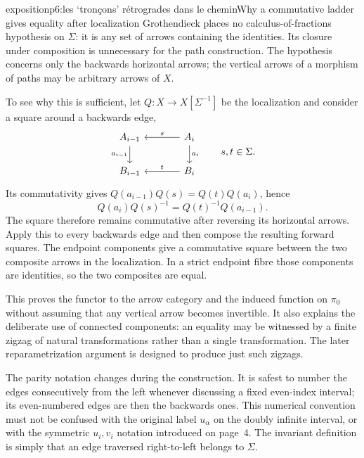 \begin{dcomment}{exposition}{p6:les `tronçons' rétrogrades dans le chemin}{Why a commutative ladder gives equality after localization}
Grothendieck places no calculus-of-fractions hypothesis on $\Sigma$: it is any set of arrows containing the identities. Its closure under composition is unnecessary for the path construction. The hypothesis concerns only the backwards horizontal arrows; the vertical arrows of a morphism of paths may be arbitrary arrows of $X$.

To see why this is sufficient, let $Q:X\to X[\Sigma^{-1}]$ be the localization and consider a square around a backwards edge,
\[
\begin{tikzcd}[column sep=large]
 A_{i-1}\arrow[d,"a_{i-1}"'] & A_i\arrow[l,"s"']\arrow[d,"a_i"]\\
 B_{i-1} & B_i\arrow[l,"t"']
\end{tikzcd}
\qquad s,t\in\Sigma.
\]
Its commutativity gives $Q(a_{i-1})Q(s)=Q(t)Q(a_i)$, hence
\[
 Q(a_i)Q(s)^{-1}=Q(t)^{-1}Q(a_{i-1}).
\]
The square therefore remains commutative after reversing its horizontal arrows. Apply this to every backwards edge and then compose the resulting forward squares. The endpoint components give a commutative square between the two composite arrows in the localization. In a strict endpoint fibre those components are identities, so the two composites are equal.

This proves the functor to the arrow category and the induced function on $\pi_0$ without assuming that any vertical arrow becomes invertible. It also explains the deliberate use of connected components: an equality may be witnessed by a finite zigzag of natural transformations rather than a single transformation. The later reparametrization argument is designed to produce just such zigzags.

The parity notation changes during the construction. It is safest to number the edges consecutively from the left whenever discussing a fixed even-index interval; its even-numbered edges are then the backwards ones. This numerical convention must not be confused with the original label $u_\alpha$ on the doubly infinite interval, or with the symmetric $u_i,v_i$ notation introduced on page~4. The invariant definition is simply that an edge traversed right-to-left belongs to $\Sigma$.
\end{dcomment}

